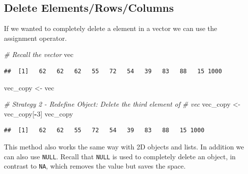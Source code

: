 \documentclass[
]{book}
\newenvironment{Shaded}{\begin{snugshade}}{\end{snugshade}}
\newcommand{\CommentTok}[1]{\textcolor[rgb]{0.56,0.35,0.01}{\textit{#1}}}
\newcommand{\DecValTok}[1]{\textcolor[rgb]{0.00,0.00,0.81}{#1}}
\newcommand{\NormalTok}[1]{#1}
\newcommand{\OperatorTok}[1]{\textcolor[rgb]{0.81,0.36,0.00}{\textbf{#1}}}
\newcommand{\OtherTok}[1]{\textcolor[rgb]{0.56,0.35,0.01}{#1}}
\newcommand{\StringTok}[1]{\textcolor[rgb]{0.31,0.60,0.02}{#1}}
\begin{document}
\hypertarget{delete-elementsrowscolumns}{%
\subsection{Delete Elements/Rows/Columns}\label{delete-elementsrowscolumns}}

If we wanted to completely delete a element in a vector we can use the assignment operator.

\begin{Shaded}
\begin{Highlighting}[]
\CommentTok{# Recall the vector}
\NormalTok{vec}
\end{Highlighting}
\end{Shaded}

\begin{verbatim}
##  [1]   62   62   62   55   72   54   39   83   88   15 1000
\end{verbatim}

\begin{Shaded}
\begin{Highlighting}[]
\NormalTok{vec_copy <-}\StringTok{ }\NormalTok{vec}

\CommentTok{# Strategy 2 - Redefine Object: Delete the third element of}
\CommentTok{# vec}
\NormalTok{vec_copy <-}\StringTok{ }\NormalTok{vec_copy[}\OperatorTok{-}\DecValTok{3}\NormalTok{]}
\NormalTok{vec_copy}
\end{Highlighting}
\end{Shaded}

\begin{verbatim}
##  [1]   62   62   55   72   54   39   83   88   15 1000
\end{verbatim}

This method also works the same way with 2D objects and lists. In addition we can also use \texttt{NULL}. Recall that \texttt{NULL} is used to completely delete an object, in contrast to \texttt{NA}, which removes the value but saves the space.

\begin{Shaded}
\end{Shaded}
\end{document}
